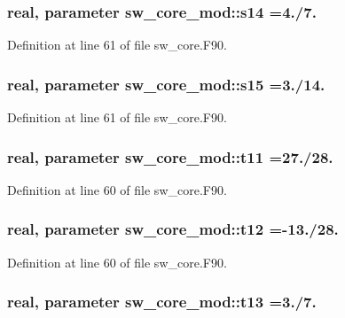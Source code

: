 \subsubsection[{s14}]{\setlength{\rightskip}{0pt plus 5cm}real, parameter sw\-\_\-core\-\_\-mod\-::s14 =4./7.}\label{classsw__core__mod_a4a938554f9d187f2d74de591f3f2f8e2}


Definition at line 61 of file sw\-\_\-core.\-F90.

\subsubsection[{s15}]{\setlength{\rightskip}{0pt plus 5cm}real, parameter sw\-\_\-core\-\_\-mod\-::s15 =3./14.}\label{classsw__core__mod_a5dcd519b6b5b3c1cf2220a199b539a76}


Definition at line 61 of file sw\-\_\-core.\-F90.

\subsubsection[{t11}]{\setlength{\rightskip}{0pt plus 5cm}real, parameter sw\-\_\-core\-\_\-mod\-::t11 =27./28.}\label{classsw__core__mod_a7be5deda022e38acf1f9d7ec6bfd49e1}


Definition at line 60 of file sw\-\_\-core.\-F90.

\subsubsection[{t12}]{\setlength{\rightskip}{0pt plus 5cm}real, parameter sw\-\_\-core\-\_\-mod\-::t12 =-\/13./28.}\label{classsw__core__mod_aae2738361377149fdb4bc680ababd8c8}


Definition at line 60 of file sw\-\_\-core.\-F90.

\subsubsection[{t13}]{\setlength{\rightskip}{0pt plus 5cm}real, parameter sw\-\_\-core\-\_\-mod\-::t13 =3./7.}\label{classsw__core__mod_ae3b60da43af913086dbd123f1f66a649}


